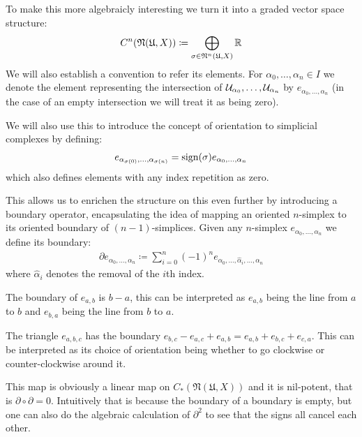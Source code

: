To make this more algebraicly interesting we turn it into a graded vector space structure:
\begin{align*}
	C^n(\mathfrak{N}(\mathfrak{U}, X)) \coloneqq \bigoplus_{\sigma \in \mathfrak{N}^n(\mathfrak{U}, X)} \mathbb{R}
\end{align*}
We will also establish a convention to refer its elements. For $\alpha_0, \dots, \alpha_n \in I$ we 
denote the element representing the intersection of $\mathcal{U}_{\alpha_0}, \dots, \mathcal{U}_{\alpha_n}$ by
$e_{\alpha_0, \dots, \alpha_n}$ (in the case of an empty intersection we will treat it as being zero).

We will also use this to introduce the concept of orientation to simplicial complexes by defining:
\begin{align*}
	e_{\alpha_{\sigma(0)}, \dots, \alpha_{\sigma(n)}} = \operatorname{sign}(\sigma) e_{\alpha_0, \dots, \alpha_n}
\end{align*}
which also defines elements with any index repetition as zero.

This allows us to enrichen the structure on this even further by introducing a boundary operator,
encapsulating the idea of mapping an oriented $n$-simplex to its oriented boundary of $(n - 1)$-simplices.
Given any $n$-simplex $e_{\alpha_0, \dots, \alpha_n}$ we define its boundary:
\begin{align*}
	\partial e_{\alpha_0, \dots, \alpha_n} \coloneqq \sum_{i = 0}^n (-1)^n e_{\alpha_0, \dots, \hat{\alpha}_i, \dots, \alpha_n}
\end{align*}
where $\hat{\alpha}_i$ denotes the removal of the $i$th index.

\begin{example}
The boundary of $e_{a, b}$ is $b - a$, this can be interpreted as $e_{a, b}$ being the line from $a$ to $b$
and $e_{b, a}$ being the line from $b$ to $a$.

The triangle $e_{a,b,c}$ has the boundary $e_{b, c} - e_{a, c} + e_{a, b} = e_{a,b} + e_{b, c} + e_{c, a}$.
This can be interpreted as its choice of orientation being whether to go clockwise or counter-clockwise around it.
\end{example}

This map is obviously a linear map on $C_*(\mathfrak{N}(\mathfrak{U}, X))$ and it is nil-potent, that is
$\partial \circ \partial = 0$. Intuitively that is because the boundary of a boundary is empty, but one
can also do the algebraic calculation of $\partial^2$ to see that the signs all cancel each other.

